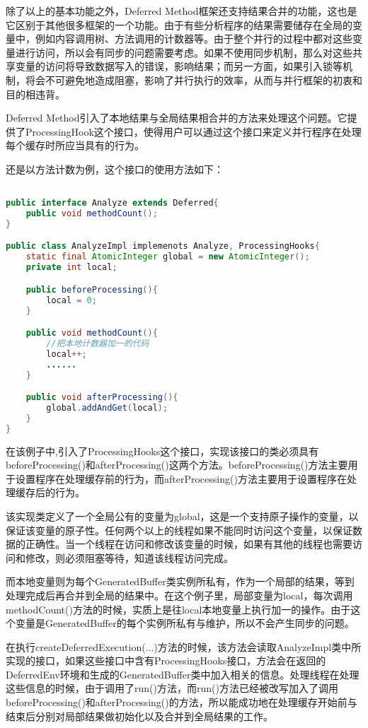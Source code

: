 除了以上的基本功能之外，Deferred Method框架还支持结果合并的功能，这也是它区别于其他很多框架的一个功能。由于有些分析程序的结果需要储存在全局的变量中，例如内容调用树、方法调用的计数器等。由于整个并行的过程中都对这些变量进行访问，所以会有同步的问题需要考虑。如果不使用同步机制，那么对这些共享变量的访问将导致数据写入的错误，影响结果；而另一方面，如果引入锁等机制，将会不可避免地造成阻塞，影响了并行执行的效率，从而与并行框架的初衷和目的相违背。

Deferred Method引入了本地结果与全局结果相合并的方法来处理这个问题。它提供了ProcessingHook这个接口，使得用户可以通过这个接口来定义并行程序在处理每个缓存时所应当具有的行为。

还是以方法计数为例，这个接口的使用方法如下：

\begin{lstlisting}[language=Java]

public interface Analyze extends Deferred{
	public void methodCount();
}

public class AnalyzeImpl implemenots Analyze, ProcessingHooks{
	static final AtomicInteger global = new AtomicInteger();
	private int local;

	public beforeProcessing(){
		local = 0;
	}

	public void methodCount(){
		//把本地计数器加一的代码
		local++;
		......
	}

	public void afterProcessing(){
		global.addAndGet(local);
	}
}
\end{lstlisting}

在该例子中,引入了ProcessingHooks这个接口，实现该接口的类必须具有beforeProcessing()和afterProcessing()这两个方法。beforeProcessing()方法主要用于设置程序在处理缓存前的行为，而afterProcessing()方法主要用于设置程序在处理缓存后的行为。

该实现类定义了一个全局公有的变量为global，这是一个支持原子操作的变量，以保证该变量的原子性。任何两个以上的线程如果不能同时访问这个变量，以保证数据的正确性。当一个线程在访问和修改该变量的时候，如果有其他的线程也需要访问和修改，则必须阻塞等待，知道该线程访问完成。

而本地变量则为每个GeneratedBuffer类实例所私有，作为一个局部的结果，等到处理完成后再合并到全局的结果中。在这个例子里，局部变量为local，每次调用methodCount()方法的时候，实质上是往local本地变量上执行加一的操作。由于这个变量是GeneratedBuffer的每个实例所私有与维护，所以不会产生同步的问题。

在执行createDeferredExecution(...)方法的时候，该方法会读取AnalyzeImpl类中所实现的接口，如果这些接口中含有ProcessingHooks接口，方法会在返回的DeferredEnv环境和生成的GeneratedBuffer类中加入相关的信息。处理线程在处理这些信息的时候，由于调用了run()方法，而run()方法已经被改写加入了调用beforeProcessing()和afterProcessing()的方法，所以能成功地在处理缓存开始前与结束后分别对局部结果做初始化以及合并到全局结果的工作。

